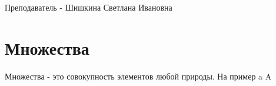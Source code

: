 
\title{}
\author{Немков Н.М}
\date{сентябрь 1, 2023}



\maketitle

\newpage
\begin{abstract}
Здесь я пишу лекции по математическому анализу варианты билетов вопросы по подготовке можно найти на электронном портале ФН-2
\end{abstract}

\newpage
\tableofcontents

\newpage

	Преподаватель - Шишкина Светлана Ивановна

\section{Множества}
\begin{множества}
	Множества - это совокупность элементов любой природы.
	На пример a \in A 
\end{множества}


\newpage
\listoftables
\listoffigures
\printbibliography

\newpage
\appendix


